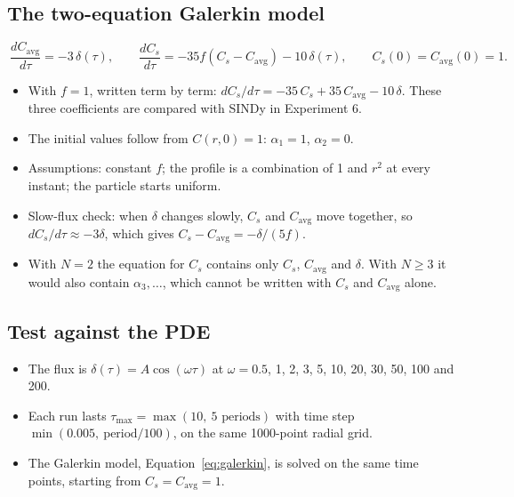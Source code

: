 \documentclass[11pt,a4paper]{article}
\newcommand{\avg}{\mathrm{avg}}
\begin{document}
\subsection{The two-equation Galerkin model}
\begin{equation}\label{eq:galerkin}
  \boxed{\ \frac{dC_\avg}{d\tau}=-3\,\delta(\tau),\qquad \frac{dC_s}{d\tau}=-35f\left(C_s-C_\avg\right)-10\,\delta(\tau),\qquad C_s(0)=C_\avg(0)=1.\ }
\end{equation}
\begin{itemize}
  \item With $f=1$, written term by term: $dC_s/d\tau=-35\,C_s+35\,C_\avg-10\,\delta$. These three coefficients are compared with SINDy in Experiment 6.
  \item The initial values follow from $C(r,0)=1$: $\alpha_1=1$, $\alpha_2=0$.
  \item Assumptions: constant $f$; the profile is a combination of 1 and $r^2$ at every instant; the particle starts uniform.
  \item Slow-flux check: when $\delta$ changes slowly, $C_s$ and $C_\avg$ move together, so $dC_s/d\tau\approx-3\delta$, which gives $C_s-C_\avg=-\delta/(5f)$.
  \item With $N=2$ the equation for $C_s$ contains only $C_s$, $C_\avg$ and $\delta$. With $N\ge3$ it would also contain $\alpha_3,\dots$, which cannot be written with $C_s$ and $C_\avg$ alone.
\end{itemize}

\subsection{Test against the PDE}\label{sec:exp5test}
\begin{itemize}
  \item The flux is $\delta(\tau)=A\cos(\omega\tau)$ at $\omega=0.5$, 1, 2, 3, 5, 10, 20, 30, 50, 100 and 200.
  \item Each run lasts $\tau_{\max}=\max(10,\ 5\text{ periods})$ with time step $\min(0.005,\ \text{period}/100)$, on the same 1000-point radial grid.
  \item The Galerkin model, Equation~\eqref{eq:galerkin}, is solved on the same time points, starting from $C_s=C_\avg=1$.
\end{itemize}
\end{document}
